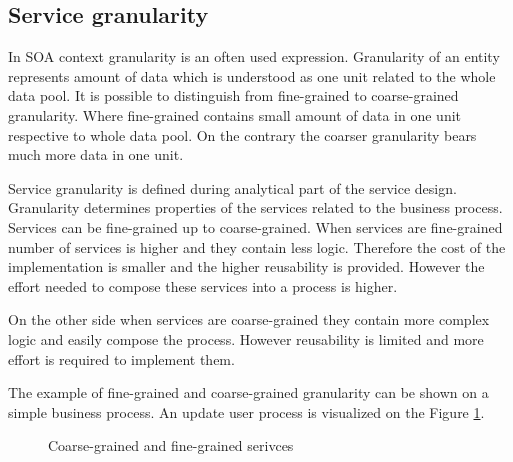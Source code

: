 \bigskip

\subsection{Service granularity}
\label{sec:granularity}
In SOA context granularity is an often used expression. Granularity of an entity represents amount of data which is understood as one unit related to the whole data pool. It is possible to distinguish from fine-grained to coarse-grained granularity. Where fine-grained contains small amount of data in one unit respective to whole data pool. On the contrary the coarser granularity bears much more data in one unit.

Service granularity is defined during analytical part of the service design. Granularity determines properties of the services related to the business process. Services can be fine-grained up to coarse-grained. When services are fine-grained number of services is higher and they contain less logic. Therefore the cost of the implementation is smaller and the higher reusability is provided. However the effort needed to compose these services into a process is higher. 

On the other side when services are coarse-grained they contain more complex logic and easily compose the process. However reusability is limited and more effort is required to implement them.

The example of fine-grained and coarse-grained granularity can be shown on a simple business process. An update user process is visualized on the Figure \ref{fig:granularity}.

\begin{figure}[htp] 
\caption{Coarse-grained and fine-grained serivces}
\label{fig:granularity}
\end{figure}

